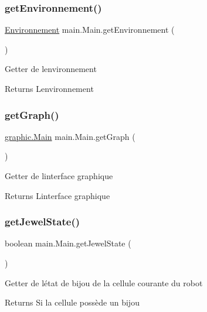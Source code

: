 \subsubsection{\texorpdfstring{get\+Environnement()}{getEnvironnement()}}
{\footnotesize\ttfamily \hyperlink{classenvironnement_1_1_environnement}{Environnement} main.\+Main.\+get\+Environnement (\begin{DoxyParamCaption}{ }\end{DoxyParamCaption})}

Getter de l\textquotesingle{}environnement \begin{DoxyReturn}{Returns}
L\textquotesingle{}environnement 
\end{DoxyReturn}
\hypertarget{classmain_1_1_main_a1daa1d9376ab5764f820ee594ff537ce}{}\label{classmain_1_1_main_a1daa1d9376ab5764f820ee594ff537ce} 
\subsubsection{\texorpdfstring{get\+Graph()}{getGraph()}}
{\footnotesize\ttfamily \hyperlink{classgraphic_1_1_main}{graphic.\+Main} main.\+Main.\+get\+Graph (\begin{DoxyParamCaption}{ }\end{DoxyParamCaption})}

Getter de l\textquotesingle{}interface graphique \begin{DoxyReturn}{Returns}
L\textquotesingle{}interface graphique 
\end{DoxyReturn}
\hypertarget{classmain_1_1_main_aa0df4a294d402074303f47f1fd33a766}{}\label{classmain_1_1_main_aa0df4a294d402074303f47f1fd33a766} 
\subsubsection{\texorpdfstring{get\+Jewel\+State()}{getJewelState()}}
{\footnotesize\ttfamily boolean main.\+Main.\+get\+Jewel\+State (\begin{DoxyParamCaption}{ }\end{DoxyParamCaption})}

Getter de l\textquotesingle{}état de bijou de la cellule courante du robot \begin{DoxyReturn}{Returns}
Si la cellule possède un bijou 
\end{DoxyReturn}
\hypertarget{classmain_1_1_main_afa1c1d8de2dbeb639cf157413f82aec2}{}\label{classmain_1_1_main_afa1c1d8de2dbeb639cf157413f82aec2} 
